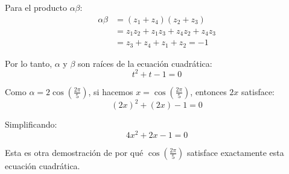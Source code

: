 Para el producto $\alpha \beta$:
\begin{align}
\alpha \beta &= (z_1 + z_4)(z_2 + z_3) \\
&= z_1 z_2 + z_1 z_3 + z_4 z_2 + z_4 z_3 \\
&= z_3 + z_4 + z_1 + z_2 = -1
\end{align}

Por lo tanto, $\alpha$ y $\beta$ son raíces de la ecuación cuadrática:
\[
t^2 + t - 1 = 0
\]

Como $\alpha = 2\cos\left(\frac{2\pi}{5}\right)$, si hacemos $x = \cos\left(\frac{2\pi}{5}\right)$, entonces $2x$ satisface:
\[
(2x)^2 + (2x) - 1 = 0
\]

Simplificando:
\[
4x^2 + 2x - 1 = 0
\]

Esta es otra demostración de por qué $\cos\left(\frac{2\pi}{5}\right)$ satisface exactamente esta ecuación cuadrática.
